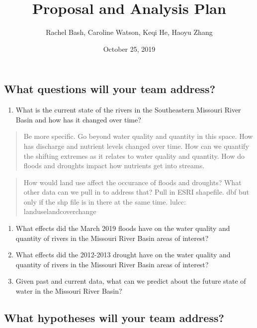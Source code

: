\documentclass[]{article}
\title{Proposal and Analysis Plan}
\author{Rachel Bash, Caroline Watson, Keqi He, Haoyu Zhang}
\date{October 25, 2019}
\providecommand{\tightlist}{%
  \setlength{\itemsep}{0pt}\setlength{\parskip}{0pt}}
\begin{document}
\maketitle

\hypertarget{what-questions-will-your-team-address}{%
\subsection{What questions will your team
address?}\label{what-questions-will-your-team-address}}

\begin{enumerate}
\def\labelenumi{\arabic{enumi}.}
\tightlist
\item
  What is the current state of the rivers in the Southeastern Missouri
  River Basin and how has it changed over time?
\end{enumerate}

\begin{quote}
Be more specific. Go beyond water quality and quantity in this space.
How has discharge and nutrient levels changed over time. How can we
quantify the shifting extremes as it relates to water quality and
quantity. How do floods and droughts impact how nutrients get into
streams.
\end{quote}

\begin{quote}
How would land use affect the occurance of floods and droughts? What
other data can we pull in to address that? Pull in ESRI shapefile. dbf
but only if the shp file is in there at the same time. lulcc:
landuselandcoverchange
\end{quote}

\begin{enumerate}
\def\labelenumi{\arabic{enumi}.}
\setcounter{enumi}{1}
\item
  What effects did the March 2019 floods have on the water quality and
  quantity of rivers in the Missouri River Basin areas of interest?
\item
  What effects did the 2012-2013 drought have on the water quality and
  quantity of rivers in the Missouri River Basin areas of interest?
\item
  Given past and current data, what can we predict about the future
  state of water in the Missouri River Basin?
\end{enumerate}

\hypertarget{what-hypotheses-will-your-team-address}{%
\subsection{What hypotheses will your team
address?}\label{what-hypotheses-will-your-team-address}}
\end{document}
